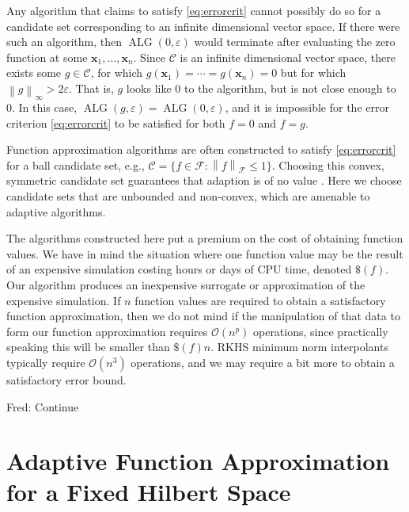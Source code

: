 \documentclass[]{mcom-l}
\theoremstyle{remark}
\DeclareMathOperator{\ALG}{ALG}
\newcommand{\bx}{{\boldsymbol{x}}}
\newcommand{\cc}{\mathcal{C}}
\newcommand{\calf}{{\mathcal{F}}}
\newcommand{\norm}[2][{}]{\ensuremath{\left \lVert #2 \right \rVert}_{#1}}
\newcommand{\Order}{\mathcal{O}}
\newcommand{\FredNote}[1]{{\color{blue}Fred: #1}}
\begin{document}
Any algorithm that claims to satisfy \eqref{eq:errorcrit} cannot possibly do so for a candidate set corresponding to an infinite dimensional vector space.  If there were such an algorithm, then $\ALG(0,\varepsilon)$ would terminate after evaluating the zero function at some $\bx_1, \ldots, \bx_n$.  Since $\cc$ is an infinite dimensional vector space, there exists some $g \in \cc$, for which $g(\bx_1) = \cdots = g(\bx_n) = 0$ but for which $\norm[\infty]{g} > 2 \varepsilon$.  That is, $g$ looks like $0$ to the algorithm, but is not close enough to $0$.  In this case, $\ALG(g,\varepsilon) = \ALG(0,\varepsilon)$, and it is impossible for the error criterion \eqref{eq:errorcrit} to be satisfied for both $f=0$ and $f = g$.

Function approximation algorithms are often constructed to satisfy \eqref{eq:errorcrit} for a ball candidate set, e.g., $\cc = \{f \in \calf : \norm[\calf]{f} \le 1\}$.  Choosing this convex, symmetric  candidate set guarantees that adaption is of no value \cite{Bak71}.  Here we choose candidate sets that are unbounded and non-convex, which are amenable to adaptive algorithms.

The algorithms constructed here put a premium on the cost of obtaining function values.  We have in mind the situation where one function value may be the result of an expensive simulation costing hours or days of CPU time, denoted $\$(f)$.  Our algorithm produces an inexpensive surrogate or approximation of the expensive simulation.  If $n$ function values are required to obtain a satisfactory function approximation, then we do not mind if the manipulation of that data to form our function approximation requires $\Order(n^p)$ operations, since practically speaking this will be smaller than $\$(f) n$.  RKHS minimum  norm interpolants typically require $\Order(n^3)$ operations, and we may require a bit more to obtain a satisfactory error bound.


\FredNote{Continue}


\section{Adaptive Function Approximation for a Fixed Hilbert Space} \label{sec:fixedF}
\end{document}
